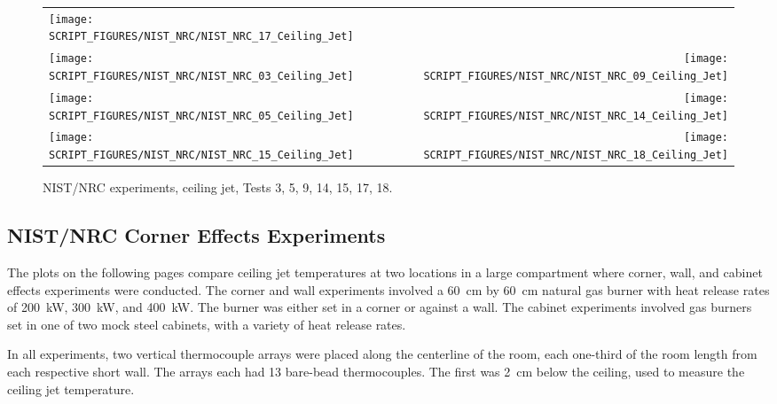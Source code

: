 \begin{figure}[p]
\begin{tabular*}{\textwidth}{l@{\extracolsep{\fill}}r}
\texttt{[image: SCRIPT\_FIGURES/NIST\_NRC/NIST\_NRC\_17\_Ceiling\_Jet]} &
 \\
\texttt{[image: SCRIPT\_FIGURES/NIST\_NRC/NIST\_NRC\_03\_Ceiling\_Jet]} &
\texttt{[image: SCRIPT\_FIGURES/NIST\_NRC/NIST\_NRC\_09\_Ceiling\_Jet]} \\
\texttt{[image: SCRIPT\_FIGURES/NIST\_NRC/NIST\_NRC\_05\_Ceiling\_Jet]} &
\texttt{[image: SCRIPT\_FIGURES/NIST\_NRC/NIST\_NRC\_14\_Ceiling\_Jet]} \\
\texttt{[image: SCRIPT\_FIGURES/NIST\_NRC/NIST\_NRC\_15\_Ceiling\_Jet]} &
\texttt{[image: SCRIPT\_FIGURES/NIST\_NRC/NIST\_NRC\_18\_Ceiling\_Jet]}
\end{tabular*}
\caption[NIST/NRC experiments, ceiling jet, Tests 3, 5, 9, 14, 15, 17, 18]
{NIST/NRC experiments, ceiling jet, Tests 3, 5, 9, 14, 15, 17, 18.}
\label{NIST_NRC_Jet_Open}
\end{figure}

\clearpage

\subsection{NIST/NRC Corner Effects Experiments}

The plots on the following pages compare ceiling jet temperatures at two locations in a large compartment where corner, wall, and cabinet effects experiments were conducted. The corner and wall experiments involved a 60~cm by 60~cm natural gas burner with heat release rates of 200~kW, 300~kW, and 400~kW. The burner was either set in a corner or against a wall. The cabinet experiments involved gas burners set in one of two mock steel cabinets, with a variety of heat release rates.

In all experiments, two vertical thermocouple arrays were placed along the centerline of the room, each one-third of the room length from each respective short wall. The arrays each had 13 bare-bead thermocouples. The first was 2~cm below the ceiling, used to measure the ceiling jet temperature.

\newpage

